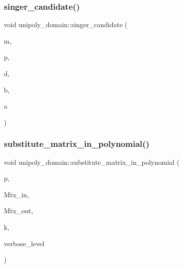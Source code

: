\mbox{\label{classunipoly__domain_a628b1f9b096099e1946c9dbfee10ab24}} 
\subsubsection{\texorpdfstring{singer\+\_\+candidate()}{singer\_candidate()}}
{\footnotesize\ttfamily void unipoly\+\_\+domain\+::singer\+\_\+candidate (\begin{DoxyParamCaption}\item[{\mbox{\hyperlink{galois_8h_a77ca58de3d2da6172242493dd9c8aaa8}{unipoly\+\_\+object}} \&}]{m,  }\item[{\mbox{\hyperlink{galois_8h_a09fddde158a3a20bd2dcadb609de11dc}{I\+NT}}}]{p,  }\item[{\mbox{\hyperlink{galois_8h_a09fddde158a3a20bd2dcadb609de11dc}{I\+NT}}}]{d,  }\item[{\mbox{\hyperlink{galois_8h_a09fddde158a3a20bd2dcadb609de11dc}{I\+NT}}}]{b,  }\item[{\mbox{\hyperlink{galois_8h_a09fddde158a3a20bd2dcadb609de11dc}{I\+NT}}}]{a }\end{DoxyParamCaption})}

\mbox{\label{classunipoly__domain_ac9a33b8c38980262f8759bfb90028f1e}} 
\subsubsection{\texorpdfstring{substitute\+\_\+matrix\+\_\+in\+\_\+polynomial()}{substitute\_matrix\_in\_polynomial()}}
{\footnotesize\ttfamily void unipoly\+\_\+domain\+::substitute\+\_\+matrix\+\_\+in\+\_\+polynomial (\begin{DoxyParamCaption}\item[{\mbox{\hyperlink{galois_8h_a77ca58de3d2da6172242493dd9c8aaa8}{unipoly\+\_\+object}} \&}]{p,  }\item[{\mbox{\hyperlink{galois_8h_a09fddde158a3a20bd2dcadb609de11dc}{I\+NT}} $\ast$}]{Mtx\+\_\+in,  }\item[{\mbox{\hyperlink{galois_8h_a09fddde158a3a20bd2dcadb609de11dc}{I\+NT}} $\ast$}]{Mtx\+\_\+out,  }\item[{\mbox{\hyperlink{galois_8h_a09fddde158a3a20bd2dcadb609de11dc}{I\+NT}}}]{k,  }\item[{\mbox{\hyperlink{galois_8h_a09fddde158a3a20bd2dcadb609de11dc}{I\+NT}}}]{verbose\+\_\+level }\end{DoxyParamCaption})}

